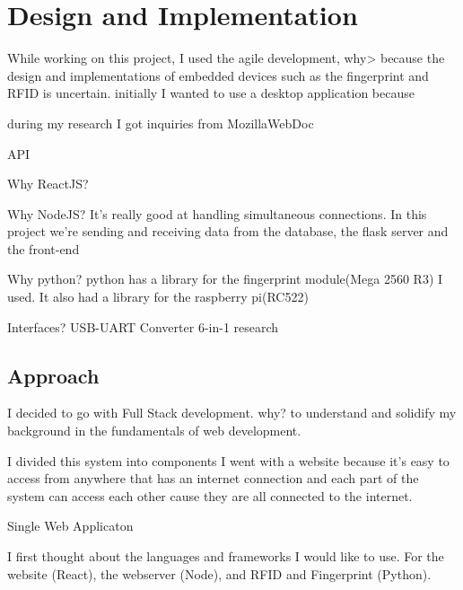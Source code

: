 \chapter{Design and Implementation}
While working on this project, I used the agile development, why> because the design and implementations of embedded devices such as the fingerprint and RFID is uncertain.  initially I wanted to use a desktop application because 

during my research I got inquiries from MozillaWebDoc

API


Why ReactJS?

Why NodeJS?
It's really good at handling simultaneous connections. In this project we're sending and receiving data from the database, the flask server and the front-end

Why python?
python has a library for the fingerprint module(Mega 2560 R3) I used. It also had a library for the raspberry pi(RC522)

Interfaces?
USB-UART Converter 6-in-1 research

\section{Approach}

I decided to go with Full Stack development. why? to understand and solidify my background in the fundamentals of web development. 

I divided this system into components 
I went with a website because it's easy to access from anywhere that has an internet connection and each part of the system can access each other cause they are all connected to the internet. 

Single Web Applicaton

I first thought about the languages and frameworks I would like to use. For the website (React), the webserver (Node), and RFID and Fingerprint (Python). 